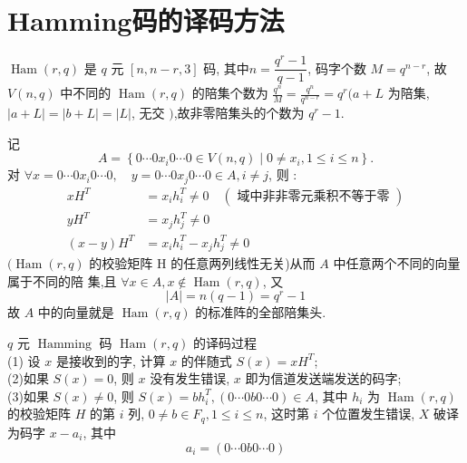 \section{Hamming码的译码方法}



$ \operatorname{Ham}(r, q) $ 是 $ q $ 元 $ [n, n-r, 3] $ 码, 其中$ n=\dfrac{q^{r}-1}{q-1} $, 码字个数 $ M=q^{n-r} $, 故 $ V(n, q) $ 中不同的 $ \operatorname{Ham}(r, q) $ 的陪集个数为 $ \frac{q^{n}}{M}=\frac{q^{n}}{q^{n-r}}=q^{r}(a+L $ 为陪集, $ |a+L|=|b+L|=|L| $, 无交 $ ) $,故非零陪集头的个数为 $ q^{r}-1 $.



记  $$A=\left\{0 \cdots 0 x_{i} 0 \cdots 0 \in V(n, q) \mid 0 \neq x_{i}, 1 \leqslant i \leqslant n\right\} .$$
对 $\forall x=0 \cdots 0 x_{i} 0 \cdots 0, \quad y=0 \cdots 0 x_{j} 0 \cdots 0 \in A, i \neq j$,  则 :
$$
\begin{aligned}
x H^{T}&=x_{i} h_{i}^{T} \neq 0 \quad(\text { 域中非非零元乘积不等于零 }) \\
y H^{T}&=x_{j} h_{j}^{T} \neq 0 \\
(x-y) H^{T}&=x_{i} h_{i}^{T}-x_{j} h_{j}^{T} \neq 0
\end{aligned}
$$
$ (\operatorname{Ham}(r, q) $ 的校验矩阵 $ \mathrm{H} $ 的任意两列线性无关)从而 $ A $ 中任意两个不同的向量属于不同的陪
集,且 $ \forall x \in A, x \notin \operatorname{Ham}(r, q) $, 又
$$
|A|=n(q-1)=q^{r}-1
$$
故 $ A $ 中的向量就是 $ \operatorname{Ham}(r, q) $ 的标准阵的全部陪集头.


$ q $ 元 $ \operatorname{Hamming} $ 码 $ \operatorname{Ham}(r, q) $ 的译码过程\\
(1) 设 $ x $ 是接收到的字, 计算 $ x $ 的伴随式 $ S(x)=x H^{T} $;\\
(2)如果 $ S(x)=0 $, 则 $ x $ 没有发生错误, $ x $ 即为信道发送端发送的码字;\\
(3)如果 $ S(x) \neq 0 $, 则 $ S(x)=b h_{i}^{T},(0 \cdots 0 b 0 \cdots 0) \in A $, 其中 $ h_{i} $ 为 $ \operatorname{Ham}(r, q) $ 的校验矩阵 $ H $ 的第 $ i $ 列, $ 0 \neq b \in F_{q}, 1 \leqslant i \leqslant n $, 这时第 $ i $ 个位置发生错误, $ X $ 破译为码字 $ x-a_{i} $, 其中
$$
a_{i}=(0 \cdots 0 b 0 \cdots 0)
$$


